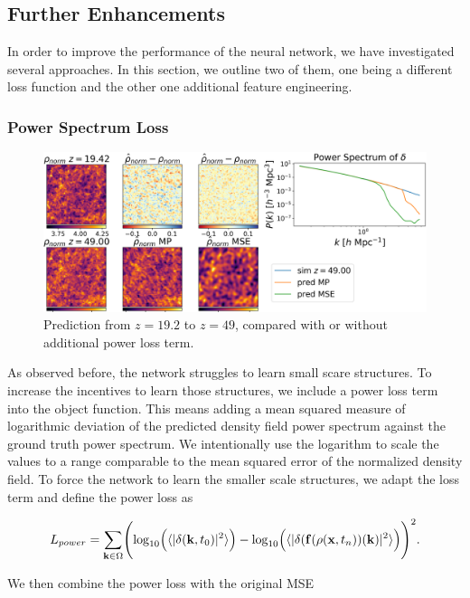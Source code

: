 \documentclass{article}
\begin{document}
\subsection{Further Enhancements}

In order to improve the performance of the neural network, we have investigated several approaches. In this section, we outline two of them, one being a different loss function and the other one additional feature engineering.

\subsubsection{Power Spectrum Loss}
\label{ps-loss}

\begin{figure}[h]
    \centering
    \includegraphics[width=0.8\linewidth]{img/compare_loss.png}
    \caption{Prediction from $z=19.2$ to $z=49$, compared with or without additional power loss term.}
    \label{fig:power-loss}
\end{figure}

As observed before, the network struggles to learn small scare structures. To increase the incentives to learn those structures, we include a power loss term into the object function. This means adding a mean squared measure of logarithmic deviation of the predicted density field power spectrum against the ground truth power spectrum. We intentionally use the logarithm to scale the values to a range comparable to the mean squared error of the normalized density field.
To force the network to learn the smaller scale structures, we adapt the loss term and define the power loss as

\begin{equation}
    L_{power} = \sum_{\mathbf{k} \in \Omega} \Biggl(  \log_{10} \Bigl( \langle |\delta(\mathbf{k}, t_0)|^2 \rangle \Bigr) - \log_{10} \Bigl( \langle |\delta(\mathbf{f}(\rho(\mathbf{x}, t_n))(\mathbf{k})|^2 \rangle \Bigr) \Biggr)^2.
\end{equation}

We then combine the power loss with the original MSE
\end{document}

